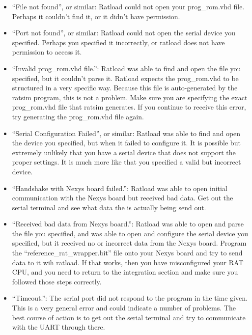 \documentclass[notitlepage]{article}
\begin{document}
\begin{itemize}
\item ``File not found'', or similar: Ratload could not open your prog\_rom.vhd file. Perhaps it couldn't find it, or it didn't have permission.
\item ``Port not found'', or similar: Ratload could not open the serial device you specified. Perhaps you specified it incorrectly, or ratload does not have permission to access it.
\item ``Invalid prog\_rom.vhd file.'': Ratload was able to find and open the file you specified, but it couldn't parse it. Ratload expects the prog\_rom.vhd to be structured in a very specific way. Because this file is auto-generated by the ratsim program, this is not a problem. Make sure you are specifying the exact prog\_rom.vhd file that ratsim generates. If you continue to receive this error, try generating the prog\_rom.vhd file again.
\item ``Serial Configuration Failed'', or similar: Ratload was able to find and open the device you specified, but when it failed to configure it. It is possible but extremely unlikely that you have a serial device that does not support the proper settings. It is much more like that you specified a valid but incorrect device.
\item ``Handshake with Nexys board failed.'': Ratload was able to open initial communication with the Nexys board but received bad data. Get out the serial terminal and see what data the is actually being send out.
\item ``Received bad data from Nexys board.'': Ratload was able to open and parse the file you specified, and was able to open and configure the serial device you specified, but it received no or incorrect data from the Nexys board. Program the ``reference\_rat\_wrapper.bit'' file onto your Nexys board and try to send data to it wih ratload. If that works, then you have misconfigured your RAT CPU, and you need to return to the integration section and make sure you followed those steps correctly. 
\item ``Timeout.'': The serial port did not respond to the program in the time given. This is a very general error and could indicate a number of problems. The best course of action is to get out the serial terminal and try to communicate with the UART through there.
\end{itemize}
\end{document}
